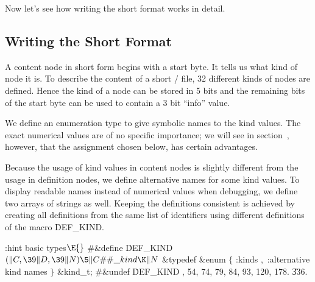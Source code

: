 Now let's see how writing the short format works in detail.


\subsection{Writing the Short Format}
A content node in short form begins with a start byte. It tells us what kind of node it is.
To describe the content of a short \HINT/ file, 32 different kinds of nodes are defined.
Hence the kind of a node can be stored in 5 bits and the remaining bits of the start byte
can be used to contain a 3 bit ``info'' value.

We define an enumeration type to give symbolic names to the kind values.
The exact numerical values are of no specific importance;
we will see in section~, however, that the assignment chosen below,
has certain advantages.

Because the usage of kind values in content nodes is
slightly different from the usage in definition nodes, we define alternative names for some kind values.
To display readable names instead of numerical values when debugging,
we define two arrays of strings as well. Keeping the definitions consistent
is achieved by creating all definitions from the same list
of identifiers using different definitions of the macro \.{DEF\_KIND}.

\Y\B\4:hint basic types\X${}\E{}$\6
\8\#\&{define} \.{DEF\_KIND} ${}(\|C,\39\|D,\39\|N)\5\|C\#{\#}\\{\_kind}\K\|N{}$\6
\&{typedef} \&{enum} ${}\{{}$\5
\1:kinds\X\5
${},{}$\5
:alternative kind names\X\5
\2${}\}{}$ \&{kind\_t};\6
\8\#\&{undef} \.{DEF\_KIND}
, 54, 74, 79, 84, 93, 120, 178.
\U336.\Y
\fi


